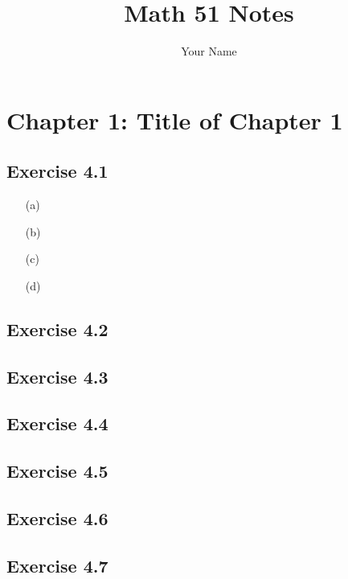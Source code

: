 \documentclass[11pt]{article}
\title{Math 51 Notes}
\author{Your Name}
\date{}
\theoremstyle{definition}
\theoremstyle{remark}
\begin{document}
\maketitle
\tableofcontents
\newpage

\section{Chapter 1: Title of Chapter 1}

\subsection{Exercise 4.1}

\begin{enumerate}
    \item[(a)] 
    \item[(b)] 
    \item[(c)] 
    \item[(d)] 
\end{enumerate}

\subsection{Exercise 4.2}

\subsection{Exercise 4.3}

\subsection{Exercise 4.4}

\subsection{Exercise 4.5}

\subsection{Exercise 4.6}

\subsection{Exercise 4.7}

\end{document}
